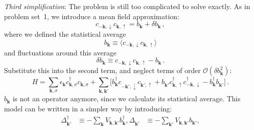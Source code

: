 \emph{Third simplification}:
The problem is still too complicated to solve exactly.
As in problem set~1, we introduce a mean field approximation:
\[
  c_{-\bm k,\downarrow} c_{\bm k,\uparrow} = b_{\bm k} + \delta b_{\bm k} \,,
\]
where we defined the statistical average 
\[
  b_{\bm k} \equiv \langle c_{-\bm k,\downarrow} c_{\bm k,\uparrow} \rangle
\]
and fluctuations around this average
\[
  \delta b_{\bm k} \equiv c_{-\bm k,\downarrow} c_{\bm k,\uparrow} - b_{\bm k} \,.
\]
Substitute this into the second term, and neglect terms of order $\mathcal{O}(\delta b_{\bm k}^2)$:
\[
  H = \sum_{\bm k,\sigma} \epsilon_{\bm k} c^\dagger_{\bm k,\sigma} c^{\phantom{\dagger}}_{\bm k,\sigma}
    + \sum_{\bm k,\bm k'} \big[ b^\dagger_{\bm k} c^{\phantom{\dagger}}_{-\bm k',\downarrow} c^{\phantom{\dagger}}_{\bm k',\uparrow}
                              + b^{\phantom{\dagger}}_{\bm k'} c^\dagger_{\bm k,\uparrow} c^\dagger_{-\bm k,\downarrow} 
                              - b^\dagger_{\bm k} b^{\phantom{\dagger}}_{\bm k'} \big] \,.
\]
$b_{\bm k}$ is not an operator anymore, since we calculate its statistical average.
This model can be written in a simpler way by introducing:
\[
  \begin{aligned}
    \Delta^\dagger_{\bm k'}             &\equiv -\sum_{\bm k}  V_{\bm k,\bm k'} b_{\bm k}^\dagger ,
    \Delta^{\phantom{\dagger}}_{\bm k'} &\equiv -\sum_{\bm k'} V_{\bm k,\bm k'} b_{\bm k'} ,
  \end{aligned}
\]
